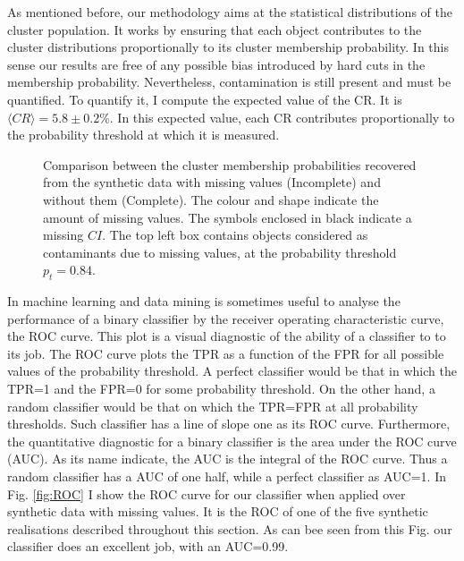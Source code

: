 As mentioned before, our methodology aims at the statistical distributions of the cluster population. It works by ensuring that each object contributes to the cluster distributions proportionally to its cluster membership probability. In this sense our results are free of any possible bias introduced by hard cuts in the membership probability. Nevertheless, contamination is still present and must be quantified. To quantify it, I compute the expected value of the CR. It is $\langle CR \rangle=5.8\pm 0.2$\%. In this expected value, each CR contributes proportionally to the  probability threshold at which it is measured. 

\begin{figure}[!htp]
\begin{center}
\caption{Comparison between the cluster membership probabilities recovered from the synthetic data with missing values (Incomplete) and without them (Complete). The colour and shape indicate the amount of missing values. The symbols enclosed in black indicate a missing $CI$. The top left box contains objects considered as contaminants due to missing values, at the probability threshold $p_t=0.84$.}
\label{figure:IncVsCom}
\end{center}
\end{figure}

In machine learning and data mining is sometimes useful to analyse the performance of a binary classifier by the receiver operating characteristic curve, the ROC curve.  This plot is a visual diagnostic of the ability of a classifier to to its job. The ROC curve plots the TPR as a function of the FPR for all possible values of the probability threshold. A perfect classifier would be that in which the TPR=1 and the FPR=0 for some probability threshold. On the other hand, a random classifier would be that on which the TPR=FPR at all probability thresholds. Such classifier has a line of slope one as its ROC curve. Furthermore, the quantitative diagnostic for a binary classifier is the area under the ROC curve (AUC). As its name indicate, the AUC is the integral of the ROC curve. Thus a random classifier has a AUC of one half, while a perfect classifier as AUC=1. In Fig. \ref{fig:ROC} I show the ROC curve for our classifier when applied over synthetic data with missing values. It is the ROC of one of the five synthetic realisations described throughout this section. As can bee seen from this Fig. our classifier does an excellent job, with an AUC=0.99.

